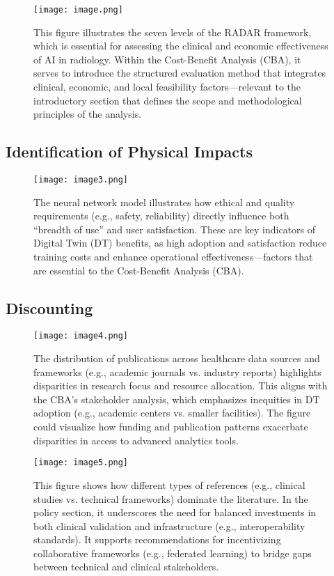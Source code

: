 \documentclass[10pt,a4paper]{article}
\begin{document}
\begin{figure} [H]
    \centering
    \texttt{[image: image.png]}
    \caption{This figure illustrates the seven levels of the RADAR framework, which is essential for assessing the clinical and economic effectiveness of AI in radiology. Within the Cost-Benefit Analysis (CBA), it serves to introduce the structured evaluation method that integrates clinical, economic, and local feasibility factors—relevant to the introductory section that defines the scope and methodological principles of the analysis.}
    \label{fig:radar}
\end{figure}

\subsection{Identification of Physical Impacts}

\begin{figure} [H]
    \centering
    \texttt{[image: image3.png]}
    \caption{The neural network model illustrates how ethical and quality requirements (e.g., safety, reliability) directly influence both “breadth of use” and user satisfaction. These are key indicators of Digital Twin (DT) benefits, as high adoption and satisfaction reduce training costs and enhance operational effectiveness—factors that are essential to the Cost-Benefit Analysis (CBA).}
    \label{fig:neuralnet}
\end{figure}

\subsection{Discounting}

\begin{figure} [H]
    \centering
    \texttt{[image: image4.png]}
    \caption{The distribution of publications across healthcare data sources and frameworks (e.g., academic journals vs. industry reports) highlights disparities in research focus and resource allocation. This aligns with the CBA’s stakeholder analysis, which emphasizes inequities in DT adoption (e.g., academic centers vs. smaller facilities). The figure could visualize how funding and publication patterns exacerbate disparities in access to advanced analytics tools.}
    \label{fig:pie}
\end{figure}

\begin{figure} [H]
    \centering
    \texttt{[image: image5.png]}
    \caption{This figure shows how different types of references (e.g., clinical studies vs. technical frameworks) dominate the literature. In the policy section, it underscores the need for balanced investments in both clinical validation and infrastructure (e.g., interoperability standards). It supports recommendations for incentivizing collaborative frameworks (e.g., federated learning) to bridge gaps between technical and clinical stakeholders.}
    \label{fig:pie1}
\end{figure}
\end{document}
